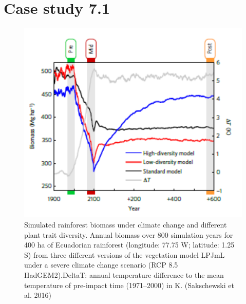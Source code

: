 \documentclass[12pt,oneside]{book}
\begin{document}
\section{Case study 7.1}\label{case-study-7.1}

\begin{figure}

{\centering \includegraphics[width=0.8\linewidth]{figures/chap7/f720_lpjML_1} 

}

\caption{Simulated rainforest biomass under climate change and different plant trait diversity. Annual biomass over 800 simulation years for 400 ha of Ecuadorian rainforest (longitude: 77.75 W; latitude: 1.25 S) from three different versions of the vegetation model LPJmL under a severe climate change scenario (RCP 8.5 HadGEM2).DeltaT: annual temperature difference to the mean temperature of pre-impact time (1971–2000) in K. (Sakschewski et al. 2016)}\label{fig:f720}
\end{figure}
\end{document}
